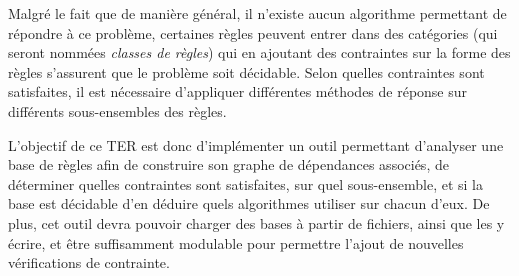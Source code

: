 
Malgré le fait que de manière général, il n'existe aucun algorithme permettant de
répondre à ce problème, certaines règles peuvent entrer dans des catégories (qui seront
nommées {\em classes de règles}) qui en ajoutant des contraintes sur la forme des règles
s'assurent que le problème soit décidable.
Selon quelles contraintes sont satisfaites, il est nécessaire d'appliquer différentes
méthodes de réponse sur différents sous-ensembles des règles.

L'objectif de ce TER est donc d'implémenter un outil permettant d'analyser une base de règles 
afin de construire son graphe
de dépendances associés, de déterminer quelles contraintes sont satisfaites, sur quel
sous-ensemble, et si la base est décidable d'en déduire quels algorithmes utiliser 
sur chacun d'eux. 
De plus, cet outil devra pouvoir charger des bases à partir de fichiers, ainsi que les y
écrire, et être suffisamment modulable pour permettre l'ajout de nouvelles vérifications
de contrainte.

